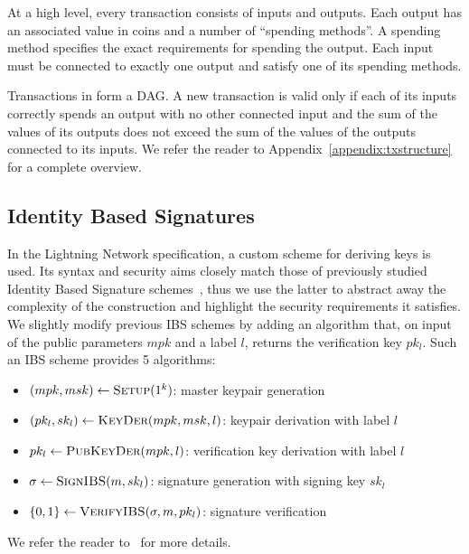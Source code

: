     At a high level, every transaction consists of inputs and outputs. Each
    output has an associated value in coins and a number of ``spending
    methods''. A spending method specifies the exact requirements for spending
    the output. Each input must be connected to exactly one output and satisfy
    one of its spending methods.

    Transactions in \ledger{} form a DAG. A new transaction is valid only if
    each of its inputs correctly spends an output with no other connected input
    and the sum of the values of its outputs does not exceed the sum of the
    values of the outputs connected to its inputs. We refer the reader to
    Appendix~\ref{appendix:txstructure} for a complete overview.

  \subsection{Identity Based Signatures}
    \label{prelim:ibs}
    In the Lightning Network specification, a custom scheme for deriving keys is
    used. Its syntax and security aims closely match those of previously studied
    Identity Based Signature schemes~\cite{ibsshamir,ibspaterson}, thus we use
    the latter to abstract away the complexity of the construction and highlight
    the security requirements it satisfies. We slightly modify previous IBS
    schemes by adding an algorithm that, on input of the public parameters $mpk$
    and a label $l$, returns the verification key $pk_l$. Such an IBS scheme
    provides 5 algorithms:
    \begin{itemize}
      \item $(mpk, msk) \leftarrow \textsc{Setup}(1^k)$: master keypair
      generation
      \item $(pk_l, sk_l) \leftarrow \textsc{KeyDer}(mpk, msk, l)$: keypair
      derivation with label $l$
      \item $pk_l \leftarrow \textsc{PubKeyDer}(mpk, l)$: verification key
      derivation with label $l$
      \item $\sigma \leftarrow \textsc{SignIBS}(m, sk_l)$: signature generation
      with signing key $sk_l$
      \item $\{0, 1\} \leftarrow \textsc{VerifyIBS}(\sigma, m, pk_l)$: signature
      verification
    \end{itemize}
    We refer the reader to~\cite{ibspaterson} for more details.  
